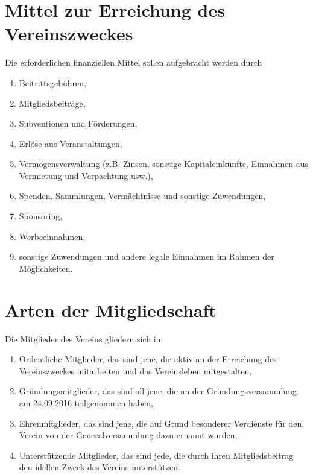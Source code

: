 \documentclass[a4paper,12pt]{article}
\begin{document}
	\section{Mittel zur Erreichung des Vereinszweckes}
		\label{sec:mittel}
		Die erforderlichen finanziellen Mittel sollen aufgebracht werden durch
		\begin{enumerate}
			\item Beitrittsgebühren,
			\item Mitgliedsbeiträge,
			\item Subventionen und Förderungen,
			\item Erlöse aus Veranstaltungen,
			\item Vermögensverwaltung (z.B. Zinsen, sonstige Kapitaleinkünfte, Einnahmen aus Vermietung und Verpachtung usw.),
			\item Spenden, Sammlungen, Vermächtnisse und sonstige Zuwendungen,
			\item Sponsoring,
			\item Werbeeinnahmen,
			\item sonstige Zuwendungen und andere legale Einnahmen im Rahmen der Möglichkeiten.
		\end{enumerate}

	\section{Arten der Mitgliedschaft}
		\label{sec:arten-mitgliedschaft}
		Die Mitglieder des Vereins gliedern sich in:
		\begin{enumerate}
			\item Ordentliche Mitglieder, das sind jene, die aktiv an der Erreichung des Vereinszweckes mitarbeiten und das Vereinsleben mitgestalten,
			\item Gründungsmitglieder, das sind all jene, die an der Gründungsversammlung am 24.09.2016 teilgenommen haben,
			\item Ehrenmitglieder, das sind jene, die auf Grund besonderer Verdienste für den Verein von der Generalversammlung dazu ernannt wurden,
			\item Unterstützende Mitglieder, das sind jede, die durch ihren Mitgliedsbeitrag den idellen Zweck des Vereins unterstützen.
		\end{enumerate}
\end{document}
